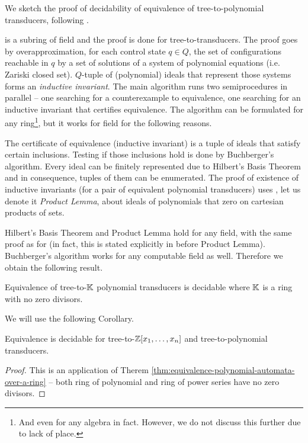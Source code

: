 We sketch the proof of decidability of equivalence of tree-to-\Z polynomial transducers, following \cite{seidlManethKemper2018}.

\Z is a subring of field \Q and the proof is done for tree-to-\Q transducers.
The proof goes by overapproximation, for each control state $q \in Q$, the set of configurations reachable in $q$ by a set of solutions of a system of polynomial equations (i.e. Zariski closed set).
$Q$-tuple of (polynomial) ideals that represent those systems forms an \emph{inductive invariant}.
The main algorithm runs two semiprocedures in parallel -- one searching for a counterexample to equivalence, one searching for an inductive invariant that certifies equivalence. The algorithm can be formulated for any ring\footnote{And even for any algebra in fact. However, we do not discuss this further due to lack of place.}, but it works for field \Q for the following reasons.

The certificate of equivalence (inductive invariant) is a tuple of ideals that satisfy certain inclusions. Testing if those inclusions hold is done by Buchberger's algorithm. Every ideal can be finitely represented due to Hilbert's Basis Theorem and in consequence, tuples of them can be enumerated.
The proof of existence of inductive invariants (for a pair of equivalent polynomial transducers) uses \cite[Lemma 6.3]{seidlManethKemper2018}, let us denote it \emph{Product Lemma}, about ideals of polynomials that zero on cartesian products of sets.

Hilbert's Basis Theorem and Product Lemma hold for any field, with the same proof as for \Q (in fact, this is stated explicitly in \cite{seidlManethKemper2018} before Product Lemma). Buchberger's algorithm works for any computable field as well.
Therefore we obtain the following result.
\begin{theorem}\label{thm:equivalence-polynomial-automata-over-a-ring}
	Equivalence of tree-to-${\mathbb K}$ polynomial transducers is decidable where ${\mathbb K}$ is a ring with no zero divisors.
\end{theorem}
We will use the following Corollary.
\begin{corollary}\label{cor:equivalence-pol-transducers-Zrat}
	Equivalence is decidable for tree-to-$\mathbb{Z}[x_{1}, \ldots, x_{n}]$ and tree-to-\Zrat polynomial transducers.
\end{corollary}
\begin{proof}
	This is an application of Therem \ref{thm:equivalence-polynomial-automata-over-a-ring} -- both ring of polynomial and ring of power series have no zero divisors.
\end{proof}
